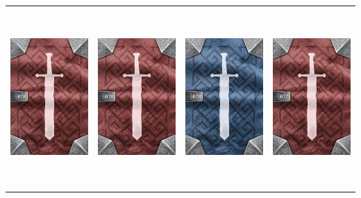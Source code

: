 \documentclass{minimal}
\begin{document}
{\begin{longtable}{llll}
\includegraphics[width=44mm,height=68mm]{./64-151/gh-078b-storm-blade-back.png} &
\includegraphics[width=44mm,height=68mm]{./64-151/gh-078b-storm-blade-back.png} &
\includegraphics[width=44mm,height=68mm]{./64-151/gh-078a-storm-blade-back.png} &
\includegraphics[width=44mm,height=68mm]{./64-151/gh-077b-frigid-blade-back.png}\\ 

\end{longtable}}
\end{document}
